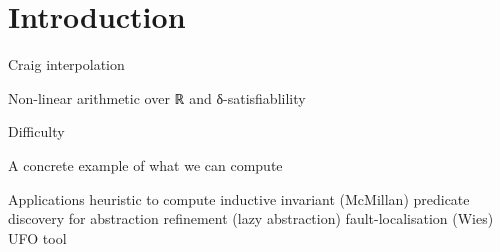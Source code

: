 \section{Introduction}
\label{sec:intro}

Craig interpolation

Non-linear arithmetic over ℝ and δ-satisfiablility

Difficulty

A concrete example of what we can compute 

Applications 
    heuristic to compute inductive invariant (McMillan)
    predicate discovery for abstraction refinement (lazy abstraction)
    fault-localisation (Wies)
    UFO tool
